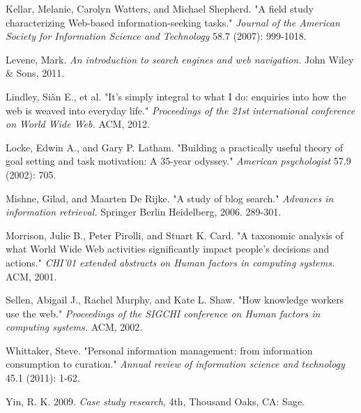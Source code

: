 \documentclass{casconpaper}
\begin{document}
{\begin{thebibliography}{9}
Kellar, Melanie, Carolyn Watters, and Michael Shepherd. "A field study characterizing Web-based information-seeking tasks." \emph{Journal of the American Society for Information Science and Technology} 58.7 (2007): 999-1018.

Levene, Mark.  \emph{An introduction to search engines and web navigation.} John Wiley \& Sons, 2011.

Lindley, Siân E., et al. "It's simply integral to what I do: enquiries into how the web is weaved into everyday life." \emph{Proceedings of the 21st international conference on World Wide Web.} ACM, 2012.

Locke, Edwin A., and Gary P. Latham. "Building a practically useful theory of goal setting and task motivation: A 35-year odyssey." \emph{American psychologist} 57.9 (2002): 705.

Mishne, Gilad, and Maarten De Rijke. "A study of blog search." \emph{Advances in information retrieval.} Springer Berlin Heidelberg, 2006. 289-301.

Morrison, Julie B., Peter Pirolli, and Stuart K. Card. "A taxonomic analysis of what World Wide Web activities significantly impact people's decisions and actions." \emph{CHI'01 extended abstracts on Human factors in computing systems.} ACM, 2001.

Sellen, Abigail J., Rachel Murphy, and Kate L. Shaw. "How knowledge workers use the web." \emph{Proceedings of the SIGCHI conference on Human factors in computing systems.} ACM, 2002.

Whittaker, Steve. "Personal information management: from information consumption to curation." \emph{Annual review of information science and technology} 45.1 (2011): 1-62.

 Yin, R. K. 2009. \emph{Case study research}, 4th, Thousand Oaks, CA: Sage.
    
\end{thebibliography}
} %
\end{document}

